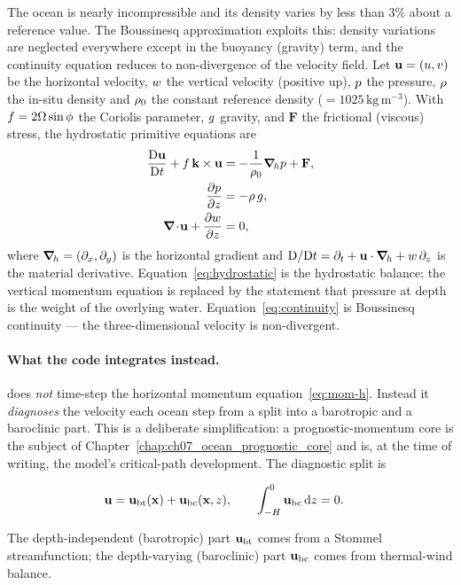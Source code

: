 The ocean is nearly incompressible and its density varies by less than
$3\%$ about a reference value. The Boussinesq approximation exploits this:
density variations are neglected everywhere except in the buoyancy
(gravity) term, and the continuity equation reduces to non-divergence of
the velocity field. Let $\mathbf{u}=(u,v)$ be the horizontal velocity,
$w$ the vertical velocity (positive up), $p$ the pressure, $\rho$
the in-situ density and $\rho_0$ the constant reference density
($=1025\,\mathrm{kg\,m^{-3}}$). With $f=2\Omega\sin\phi$
the Coriolis parameter, $g$ gravity, and $\mathbf{F}$ the frictional
(viscous) stress, the hydrostatic primitive equations are
\citep{vallis2017}
\begin{align}
  \frac{\mathrm{D}\mathbf{u}}{\mathrm{D}t} + f\,\mathbf{k}\times\mathbf{u}
    &= -\frac{1}{\rho_0}\boldsymbol{\nabla}_{\!h}p + \mathbf{F}, \label{eq:mom-h}\\
  \frac{\partial p}{\partial z} &= -\rho\,g, \label{eq:hydrostatic}\\
  \boldsymbol{\nabla}\!\cdot\!\mathbf{u} + \frac{\partial w}{\partial z} &= 0, \label{eq:continuity}
\end{align}
where $\boldsymbol{\nabla}_{\!h}=(\partial_x,\partial_y)$ is the horizontal gradient and
$\mathrm{D}/\mathrm{D}t=\partial_t+\mathbf{u}\cdot\boldsymbol{\nabla}_{\!h}+w\,\partial_z$
is the material derivative. Equation~\eqref{eq:hydrostatic} is the
hydrostatic balance: the vertical momentum equation is replaced by the
statement that pressure at depth is the weight of the overlying water.
Equation~\eqref{eq:continuity} is Boussinesq continuity --- the
three-dimensional velocity is non-divergent.

\paragraph{What the code integrates instead.}
\model{} does \emph{not} time-step the horizontal momentum
equation~\eqref{eq:mom-h}. Instead it \emph{diagnoses} the velocity each
ocean step from a split into a barotropic and a baroclinic part. This is a
deliberate simplification: a prognostic-momentum core is the subject of
Chapter~\ref{chap:ch07_ocean_prognostic_core} and is, at the time of
writing, the model's critical-path development. The diagnostic split is

\begin{align}
  \mathbf{u} &= \mathbf{u}_{\mathrm{bt}}(\mathbf{x}) + \mathbf{u}_{\mathrm{bc}}(\mathbf{x},z),
  \qquad \int_{-H}^{0}\mathbf{u}_{\mathrm{bc}}\,\mathrm{d} z = 0 . \label{eq:split}
\end{align}

The depth-independent (barotropic) part $\mathbf{u}_{\mathrm{bt}}$ comes from a
Stommel streamfunction; the depth-varying (baroclinic) part
$\mathbf{u}_{\mathrm{bc}}$ comes from thermal-wind balance.


